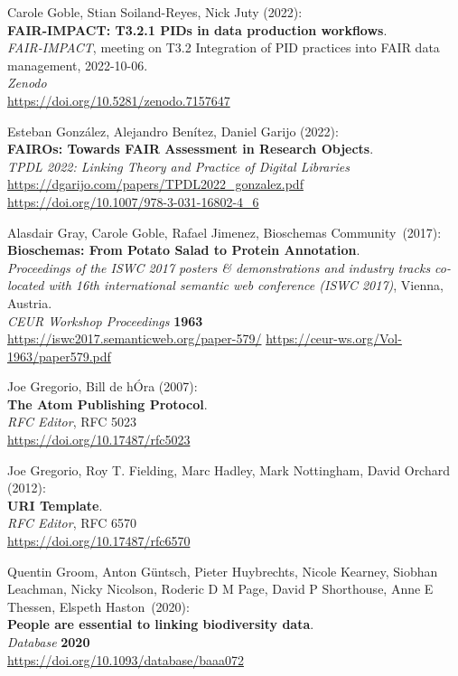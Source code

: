 \begin{thebibliography}{9}
Carole Goble, Stian Soiland-Reyes, Nick Juty (2022):\\
\textbf{FAIR-IMPACT: T3.2.1 PIDs in data production workflows}.\\
\emph{FAIR-IMPACT}, meeting on T3.2 Integration of PID practices into FAIR data management, 2022-10-06.\\
\emph{Zenodo}\\
\url{https://doi.org/10.5281/zenodo.7157647}

Esteban González, Alejandro Benítez, Daniel Garijo (2022):\\
\textbf{FAIROs: Towards FAIR Assessment in Research Objects}.\\
\emph{TPDL 2022: Linking Theory and Practice of Digital Libraries}\\
\url{https://dgarijo.com/papers/TPDL2022_gonzalez.pdf}\\
\url{https://doi.org/10.1007/978-3-031-16802-4_6}

Alasdair Gray, Carole Goble, Rafael Jimenez, Bioschemas
Community~(2017):\\
\textbf{Bioschemas: From Potato Salad to Protein Annotation}.\\
\emph{Proceedings of the ISWC 2017 posters \& demonstrations and
industry tracks co-located with 16th international semantic web
conference (ISWC 2017)}, Vienna, Austria.\\
\emph{CEUR Workshop Proceedings} \textbf{1963} \\
\url{https://iswc2017.semanticweb.org/paper-579/}
\url{https://ceur-ws.org/Vol-1963/paper579.pdf}

Joe Gregorio, Bill de hÓra (2007): \\
\textbf{The {Atom Publishing Protocol}}.\\
\emph{RFC Editor}, RFC 5023\\
\url{https://doi.org/10.17487/rfc5023}

Joe Gregorio, Roy T. Fielding, Marc Hadley, Mark Nottingham, David Orchard (2012):\\
\textbf{{URI Template}}.\\
\emph{RFC Editor}, RFC 6570 \\
\url{https://doi.org/10.17487/rfc6570}

Quentin Groom, Anton Güntsch, Pieter Huybrechts, Nicole Kearney, Siobhan Leachman, Nicky Nicolson, Roderic D M Page, David P Shorthouse, Anne E Thessen, Elspeth Haston~(2020):\\
\textbf{People are essential to linking biodiversity data}.\\
\emph{Database} \textbf{2020}\\
\url{https://doi.org/10.1093/database/baaa072}


\end{thebibliography}
